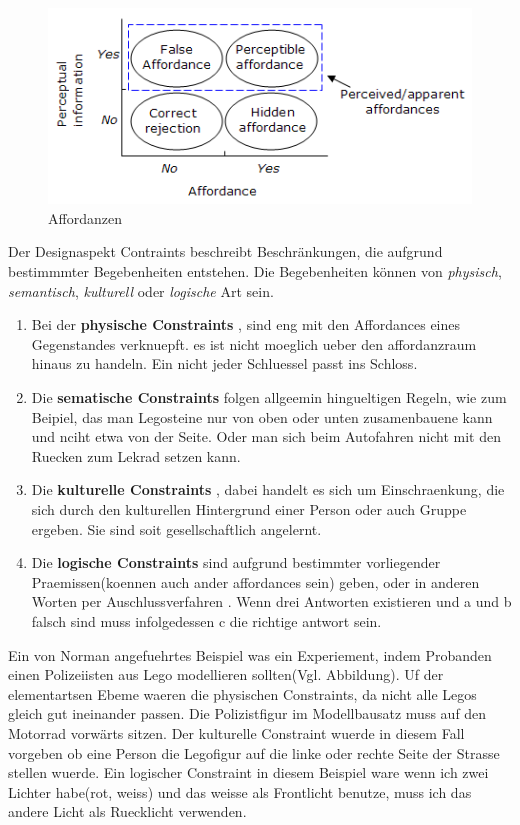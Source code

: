 \documentclass[parskip,headsepline, headtopline, %
footsepline, oneside, 12pt, headings=small]{scrreprt}
\begin{document}
\begin{figure}
\includegraphics{images/figure2_affordances.png}
\caption{Affordanzen}
\label{fig:action}
\end{figure}

Der Designaspekt Contraints beschreibt Beschränkungen, die aufgrund bestimmmter Begebenheiten entstehen. Die Begebenheiten können von \textit{physisch}, \textit{semantisch}, \textit{kulturell} oder \textit{logische} Art sein.

\begin{enumerate}
\item Bei der \textbf{physische Constraints} , sind eng mit den Affordances eines Gegenstandes verknuepft. es ist nicht moeglich ueber den affordanzraum hinaus zu handeln. Ein nicht jeder Schluessel passt ins Schloss.
\item Die \textbf{sematische Constraints} folgen allgeemin hingueltigen Regeln, wie zum Beipiel,  das man Legosteine nur von oben oder unten zusamenbauene kann und nciht etwa von der Seite. Oder man sich beim Autofahren  nicht mit den Ruecken zum Lekrad setzen kann.
\item Die \textbf{kulturelle Constraints} , dabei handelt es sich um Einschraenkung, die sich durch den kulturellen Hintergrund einer Person oder auch Gruppe ergeben. Sie sind soit gesellschaftlich angelernt.
\item Die \textbf{logische Constraints} sind aufgrund bestimmter vorliegender Praemissen(koennen auch ander affordances sein) geben, oder in anderen Worten per \glqq Auschlussverfahren \grqq. Wenn drei Antworten existieren und a und b falsch sind muss infolgedessen c die richtige antwort sein. 
\end{enumerate}


Ein von Norman angefuehrtes Beispiel was ein Experiement, indem Probanden einen Polizeiisten aus  Lego modellieren sollten(Vgl. Abbildung).
Uf der elementartsen Ebeme waeren die physischen Constraints, da nicht alle Legos gleich gut ineinander passen. 
Die  Polizistfigur im Modellbausatz muss auf den Motorrad vorwärts sitzen. Der kulturelle Constraint wuerde in diesem Fall vorgeben ob eine Person die Legofigur auf die linke oder rechte Seite der Strasse stellen wuerde.  Ein logischer Constraint in diesem Beispiel ware wenn ich zwei Lichter habe(rot, weiss) und das weisse als Frontlicht benutze, muss ich das andere Licht als Ruecklicht verwenden. 
\end{document}
